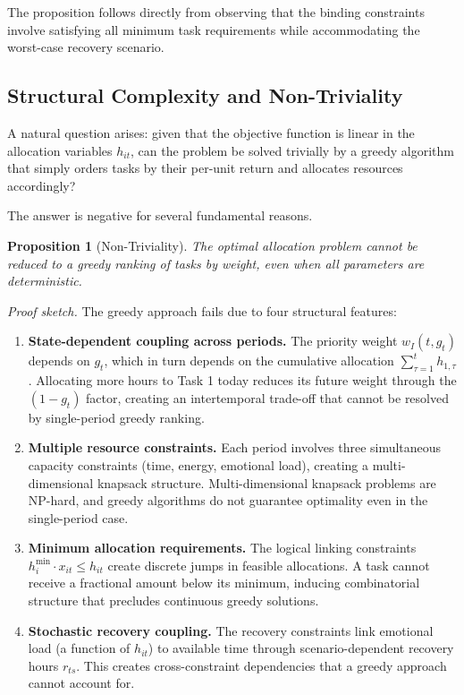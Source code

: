 \documentclass[preprint,review,11pt]{elsarticle}
\newtheorem{proposition}{Proposition}
\begin{document}
The proposition follows directly from observing that the binding constraints involve satisfying all minimum task requirements while accommodating the worst-case recovery scenario.

\subsection{Structural Complexity and Non-Triviality}

A natural question arises: given that the objective function is linear in the allocation variables $h_{it}$, can the problem be solved trivially by a greedy algorithm that simply orders tasks by their per-unit return and allocates resources accordingly?

The answer is negative for several fundamental reasons.

\begin{proposition}[Non-Triviality]
The optimal allocation problem cannot be reduced to a greedy ranking of tasks by weight, even when all parameters are deterministic.
\end{proposition}

\textit{Proof sketch.} The greedy approach fails due to four structural features:

\begin{enumerate}
    \item \textbf{State-dependent coupling across periods.} The priority weight $w_I(t, g_t)$ depends on $g_t$, which in turn depends on the cumulative allocation $\sum_{\tau=1}^{t} h_{1,\tau}$. Allocating more hours to Task 1 today reduces its future weight through the $(1 - g_t)$ factor, creating an intertemporal trade-off that cannot be resolved by single-period greedy ranking.
    
    \item \textbf{Multiple resource constraints.} Each period involves three simultaneous capacity constraints (time, energy, emotional load), creating a multi-dimensional knapsack structure. Multi-dimensional knapsack problems are NP-hard, and greedy algorithms do not guarantee optimality even in the single-period case.
    
    \item \textbf{Minimum allocation requirements.} The logical linking constraints $h_i^{\min} \cdot x_{it} \leq h_{it}$ create discrete jumps in feasible allocations. A task cannot receive a fractional amount below its minimum, inducing combinatorial structure that precludes continuous greedy solutions.
    
    \item \textbf{Stochastic recovery coupling.} The recovery constraints link emotional load (a function of $h_{it}$) to available time through scenario-dependent recovery hours $r_{ts}$. This creates cross-constraint dependencies that a greedy approach cannot account for.
\end{enumerate}
\end{document}
